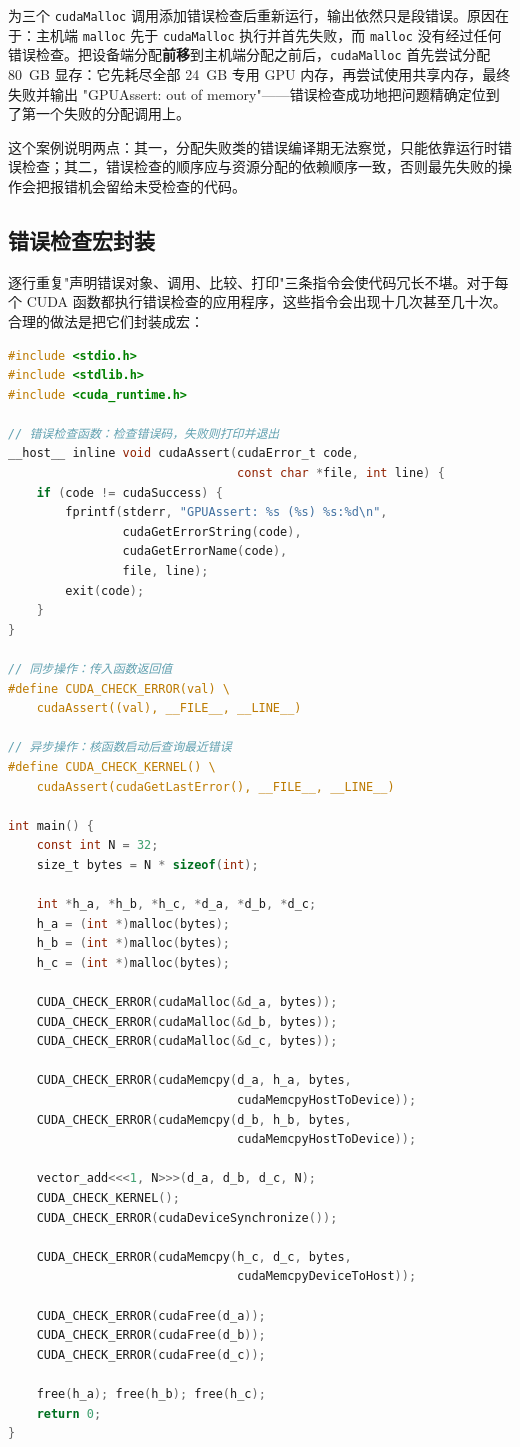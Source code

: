为三个 \texttt{cudaMalloc} 调用添加错误检查后重新运行，输出依然只是段错误。原因在于：主机端 \texttt{malloc} 先于 \texttt{cudaMalloc} 执行并首先失败，而 \texttt{malloc} 没有经过任何错误检查。把设备端分配\textbf{前移}到主机端分配之前后，\texttt{cudaMalloc} 首先尝试分配 80~GB 显存：它先耗尽全部 24~GB 专用 GPU 内存，再尝试使用共享内存，最终失败并输出 "GPUAssert: out of memory"——错误检查成功地把问题精确定位到了第一个失败的分配调用上。

这个案例说明两点：其一，分配失败类的错误编译期无法察觉，只能依靠运行时错误检查；其二，错误检查的顺序应与资源分配的依赖顺序一致，否则最先失败的操作会把报错机会留给未受检查的代码。

\subsection{错误检查宏封装}

逐行重复"声明错误对象、调用、比较、打印"三条指令会使代码冗长不堪。对于每个 CUDA 函数都执行错误检查的应用程序，这些指令会出现十几次甚至几十次。合理的做法是把它们封装成宏：

\begin{lstlisting}[language=C]
#include <stdio.h>
#include <stdlib.h>
#include <cuda_runtime.h>

// 错误检查函数：检查错误码，失败则打印并退出
__host__ inline void cudaAssert(cudaError_t code,
                                const char *file, int line) {
    if (code != cudaSuccess) {
        fprintf(stderr, "GPUAssert: %s (%s) %s:%d\n",
                cudaGetErrorString(code),
                cudaGetErrorName(code),
                file, line);
        exit(code);
    }
}

// 同步操作：传入函数返回值
#define CUDA_CHECK_ERROR(val) \
    cudaAssert((val), __FILE__, __LINE__)

// 异步操作：核函数启动后查询最近错误
#define CUDA_CHECK_KERNEL() \
    cudaAssert(cudaGetLastError(), __FILE__, __LINE__)

int main() {
    const int N = 32;
    size_t bytes = N * sizeof(int);

    int *h_a, *h_b, *h_c, *d_a, *d_b, *d_c;
    h_a = (int *)malloc(bytes);
    h_b = (int *)malloc(bytes);
    h_c = (int *)malloc(bytes);

    CUDA_CHECK_ERROR(cudaMalloc(&d_a, bytes));
    CUDA_CHECK_ERROR(cudaMalloc(&d_b, bytes));
    CUDA_CHECK_ERROR(cudaMalloc(&d_c, bytes));

    CUDA_CHECK_ERROR(cudaMemcpy(d_a, h_a, bytes,
                                cudaMemcpyHostToDevice));
    CUDA_CHECK_ERROR(cudaMemcpy(d_b, h_b, bytes,
                                cudaMemcpyHostToDevice));

    vector_add<<<1, N>>>(d_a, d_b, d_c, N);
    CUDA_CHECK_KERNEL();
    CUDA_CHECK_ERROR(cudaDeviceSynchronize());

    CUDA_CHECK_ERROR(cudaMemcpy(h_c, d_c, bytes,
                                cudaMemcpyDeviceToHost));

    CUDA_CHECK_ERROR(cudaFree(d_a));
    CUDA_CHECK_ERROR(cudaFree(d_b));
    CUDA_CHECK_ERROR(cudaFree(d_c));

    free(h_a); free(h_b); free(h_c);
    return 0;
}
\end{lstlisting}

